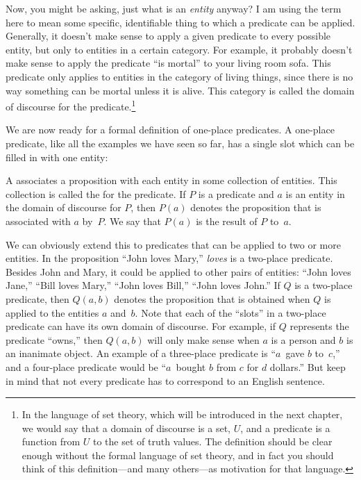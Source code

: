 Now, you might be asking, just what is an \emph{entity} anyway?
I am using the term here to mean some specific, identifiable thing
to which a predicate can be applied.  Generally, it doesn't make
sense to apply a given predicate to every possible entity, but only
to entities in a certain category.  For example, it probably doesn't
make sense to apply the predicate ``is mortal'' to your living room
sofa.  This predicate only applies to entities in the category of
living things, since there is no way something can be mortal unless it
is alive.  This category is called the domain of discourse for
the predicate.\footnote{In the language
of set theory, which will be introduced in the next chapter,
we would say that a domain of discourse is a set, $U$, and
a predicate is a function from $U$ to the set of truth values.
The definition should be clear enough without the formal language
of set theory, and in fact you should think of this definition---and
many others---as motivation for that language.}

We are now ready for a formal definition of one-place
predicates.  A one-place
predicate, like all the examples we have seen so far, has a single
slot which can be filled in with one entity:


\begin{definition}
A  associates a proposition with each entity in some
collection of entities.  This collection is called the  for the predicate.  If $P$ is a predicate and $a$ is
an entity in the domain of discourse for $P$, then $P(a)$ denotes
the proposition that is associated with $a$ by~$P$.  We say that $P(a)$
is the result of  $P$ to~$a$.
\end{definition}

We can obviously extend this to predicates that can be applied to
two or more entities.  In the proposition ``John loves Mary,''
\emph{loves} is a two-place predicate.  Besides John and Mary,
it could be applied to other pairs of entities:  ``John loves Jane,''
``Bill loves Mary,'' ``John loves Bill,''  ``John loves John.''
If $Q$ is a two-place
predicate, then $Q(a,b)$ denotes the proposition that is obtained
when $Q$ is applied to the entities $a$ and~$b$.  Note that each of
the ``slots'' in a two-place predicate can have its own domain of
discourse.  For example, if $Q$ represents the predicate ``owns,''
then $Q(a,b)$ will only make sense when $a$ is a person and $b$ is an
inanimate object.  An example of a three-place predicate is
``$a$~gave $b$ to~$c$,'' and a four-place predicate would be
``$a$~bought $b$ from $c$ for $d$ dollars.''  But keep in mind that
not every predicate has to correspond to an English sentence.

